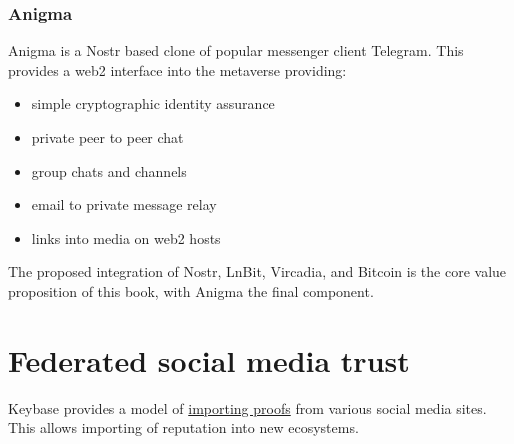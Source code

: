 \subsubsection{Anigma}
Anigma is a Nostr based clone of popular messenger client Telegram. This provides a web2 interface into the metaverse providing:
\begin{itemize}
\item simple cryptographic identity assurance
\item private peer to peer chat
\item group chats and channels
\item email to private message relay
\item links into media on web2 hosts
\end{itemize}
The proposed integration of Nostr, LnBit, Vircadia, and Bitcoin is the core value proposition of this book, with Anigma the final component.
\section{Federated social media trust}
Keybase provides a model of \href{https://book.keybase.io/account#proofs}{importing proofs} from various social media sites. This allows importing of reputation into new ecosystems.
